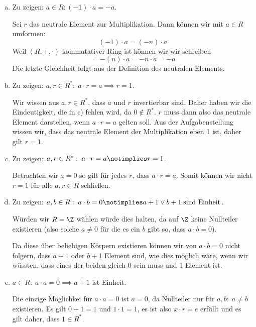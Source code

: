 \begin{enumerate}[a)]
  \item Zu zeigen: $a \in R: (-1) \cdot a = -a$.

  Sei $r$ das neutrale Element zur Multiplikation. Dann können wir mit $a \in R$ umformen:
  \[ (-1) \cdot a = (-n) \cdot a \]
  Weil $(R, +, \cdot)$ kommutativer Ring ist können wir wir schreiben
  \[
    = -(n) \cdot a = -n \cdot a = -a
  \]
  Die letzte Gleichheit folgt aus der Definition des neutralen Elements. \\

  \item Zu zeigen: $  a,r \in R^{*}: \; a \cdot r = a \implies r = 1$.

  Wir wissen aus $a, r \in R^{*}$, dass $a$ und $r$ invertierbar sind. Daher haben wir die Eindeutigkeit, die in c) fehlen wird, da $0 \notin R^{*}$. $r$ muss dann also das neutrale Element darstellen, wenn $a \cdot r = a$ gelten soll. Aus der Aufgabenstellung wissen wir, dass das neutrale Element der Multiplikation eben 1 ist, daher gilt $r=1$. \\

  \item Zu zeigen: $  a,r \in R^{*}: \; a \cdot r = a \notimplies r = 1$.

  Betrachten wir $a=0$ so gilt für jedes $r$, dass $a \cdot r = a$. Somit können wir nicht $r=1$ für alle $a, r \in R$ schließen.\\

  \item Zu zeigen: $a, b \in R: \; a \cdot b = 0 \notimplies a + 1 \lor b+1 \; \text{sind Einheit}$.

  Würden wir $R = \Z$ wählen würde dies halten, da auf $\Z$ keine Nullteiler existieren (also solche $a \neq 0$ für die es ein $b$ gibt so, dass $a \cdot b = 0$).

  Da diese über beliebigen Körpern existieren können wir von $a \cdot b = 0$ nicht folgern, dass $a+1$ oder $b+1$ Element sind, wie dies möglich wäre, wenn wir wüssten, dass eines der beiden gleich 0 sein muss und 1 Element ist.\\

  \item $a \in R: \; a \cdot a = 0 \implies a+1$ ist Einheit.

  Die einzige Möglichkei für $a \cdot a = 0$ ist $a = 0$, da Nullteiler nur für $a, b: \; a \neq b$ existieren. Es gilt $0+1 = 1$ und $1 \cdot 1 = 1$, es ist also $x \cdot r = e$ erfüllt und es gilt daher, dass $1 \in R^{*}$.\\





\end{enumerate}
